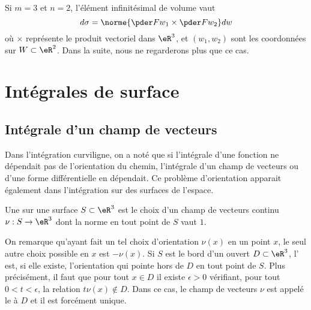 Si $m = 3$ et $n = 2$, l'élément infinitésimal de volume vaut
\begin{equation*}
  d \sigma = \norme{\pder F {w_1} \times \pder F {w_2}} dw
\end{equation*}
où $\times$ représente le produit vectoriel dans $\eR^3$, et $(w_1,w_2)$ sont les coordonnées sur $W \subset \eR^2$. Dans la suite, nous ne regarderons plus que ce cas.

\section{Intégrales de surface}
\label{secintsurfaciques}

\subsection{Intégrale d'un champ de vecteurs}
Dans l'intégration curviligne, on a noté que si l'intégrale d'une fonction ne dépendait pas de l'orientation du chemin, l'intégrale d'un champ de vecteurs ou d'une forme différentielle en dépendait. Ce problème d'orientation apparait également dans l'intégration sur des surfaces de l'espace.

\begin{definition}
    Une  sur une surface $S \subset \eR^3$ est le choix d'un champ de vecteurs continu $\nu : S \to \eR^3$ dont la norme en tout point de $S$ vaut $1$.
\end{definition}

On remarque qu'ayant fait un tel choix
d'orientation $\nu(x)$ en un point $x$, le seul autre choix possible
en $x$ est $-\nu(x)$.
Si $S$ est le bord d'un ouvert $D \subset \eR^3$, l' est, si elle existe, l'orientation qui
pointe hors de $D$ en tout point de $S$. Plus précisément, il faut que
pour tout $x \in D$ il existe $\epsilon > 0$ vérifiant, pour tout $0 <
t < \epsilon$, la relation $t \nu(x) \notin D$. Dans ce cas, le champ
de vecteurs $\nu$ est appelé le  à $D$ et il est forcément unique.

